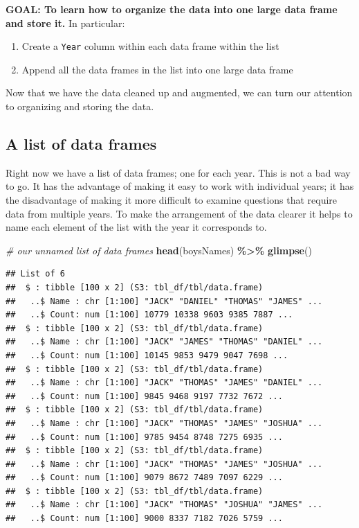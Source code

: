\documentclass[
]{book}
\newenvironment{Shaded}{\begin{snugshade}}{\end{snugshade}}
\newcommand{\CommentTok}[1]{\textcolor[rgb]{0.56,0.35,0.01}{\textit{#1}}}
\newcommand{\KeywordTok}[1]{\textcolor[rgb]{0.13,0.29,0.53}{\textbf{#1}}}
\newcommand{\NormalTok}[1]{#1}
\newcommand{\OperatorTok}[1]{\textcolor[rgb]{0.81,0.36,0.00}{\textbf{#1}}}
\newcommand{\StringTok}[1]{\textcolor[rgb]{0.31,0.60,0.02}{#1}}
\providecommand{\tightlist}{%
  \setlength{\itemsep}{0pt}\setlength{\parskip}{0pt}}
\begin{document}
\begin{alert}

\textbf{GOAL: To learn how to organize the data into one large data frame and store it.} In particular:

\begin{enumerate}
\def\labelenumi{\arabic{enumi}.}
\tightlist
\item
  Create a \texttt{Year} column within each data frame within the list
\item
  Append all the data frames in the list into one large data frame
\end{enumerate}

\end{alert}

Now that we have the data cleaned up and augmented, we can turn our attention to organizing and storing the data.

\hypertarget{a-list-of-data-frames}{%
\subsection{A list of data frames}\label{a-list-of-data-frames}}

Right now we have a list of data frames; one for each year. This is not a bad way to go. It has the advantage of making it easy to work with individual years; it has the disadvantage of making it more difficult to examine questions that require data from multiple years. To make the arrangement of the data clearer it helps to name each element of the list with the year it corresponds to.

\begin{Shaded}
\begin{Highlighting}[]
\CommentTok{\# our unnamed list of data frames}
\KeywordTok{head}\NormalTok{(boysNames) }\OperatorTok{\%\textgreater{}\%}\StringTok{ }\KeywordTok{glimpse}\NormalTok{()}
\end{Highlighting}
\end{Shaded}

\begin{verbatim}
## List of 6
##  $ : tibble [100 x 2] (S3: tbl_df/tbl/data.frame)
##   ..$ Name : chr [1:100] "JACK" "DANIEL" "THOMAS" "JAMES" ...
##   ..$ Count: num [1:100] 10779 10338 9603 9385 7887 ...
##  $ : tibble [100 x 2] (S3: tbl_df/tbl/data.frame)
##   ..$ Name : chr [1:100] "JACK" "JAMES" "THOMAS" "DANIEL" ...
##   ..$ Count: num [1:100] 10145 9853 9479 9047 7698 ...
##  $ : tibble [100 x 2] (S3: tbl_df/tbl/data.frame)
##   ..$ Name : chr [1:100] "JACK" "THOMAS" "JAMES" "DANIEL" ...
##   ..$ Count: num [1:100] 9845 9468 9197 7732 7672 ...
##  $ : tibble [100 x 2] (S3: tbl_df/tbl/data.frame)
##   ..$ Name : chr [1:100] "JACK" "THOMAS" "JAMES" "JOSHUA" ...
##   ..$ Count: num [1:100] 9785 9454 8748 7275 6935 ...
##  $ : tibble [100 x 2] (S3: tbl_df/tbl/data.frame)
##   ..$ Name : chr [1:100] "JACK" "THOMAS" "JAMES" "JOSHUA" ...
##   ..$ Count: num [1:100] 9079 8672 7489 7097 6229 ...
##  $ : tibble [100 x 2] (S3: tbl_df/tbl/data.frame)
##   ..$ Name : chr [1:100] "JACK" "THOMAS" "JOSHUA" "JAMES" ...
##   ..$ Count: num [1:100] 9000 8337 7182 7026 5759 ...
\end{verbatim}
\end{document}
